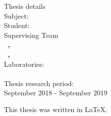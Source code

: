 \pagestyle{empty}
\hspace{10pt}
\begin{center}
\Large{Thesis details}\\[1cm]
{\large Subject:}
\textbf{\large \doctitle}\\[1cm]
\large {Student: \textbf{\nomme}\\[1cm]
\large{Supervising Team}\\
\textbf{\suptitle \, \supname , \supuni}\\[1cm]
\textbf{\cosuptitle \, \cosupname , \cosupuni} \\[1cm]
Laboratories:\\
\lab \\[1cm]
Thesis research period:\\ September 2018 - September 2019\\[1cm]}
\end{center}

\vspace{5em}

\begin{center}
  { \large
    This thesis was written in \LaTeX.\\
  }
\end{center}

